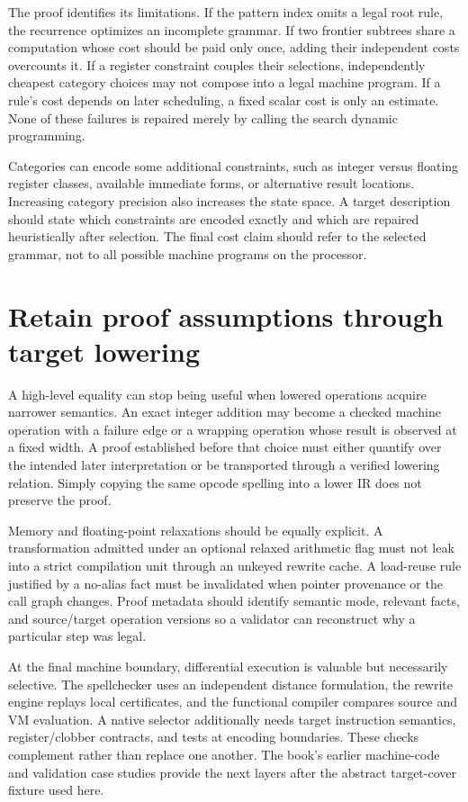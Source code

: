 The proof identifies its limitations.
If the pattern index omits a legal root rule, the recurrence optimizes an incomplete grammar.
If two frontier subtrees share a computation whose cost should be paid only once, adding their independent costs overcounts it.
If a register constraint couples their selections, independently cheapest category choices may not compose into a legal machine program.
If a rule's cost depends on later scheduling, a fixed scalar cost is only an estimate.
None of these failures is repaired merely by calling the search dynamic programming.

Categories can encode some additional constraints, such as integer versus floating register classes, available immediate forms, or alternative result locations.
Increasing category precision also increases the state space.
A target description should state which constraints are encoded exactly and which are repaired heuristically after selection.
The final cost claim should refer to the selected grammar, not to all possible machine programs on the processor.

\section{Retain proof assumptions through target lowering}
\label{sec:ch88-assumptions}
A high-level equality can stop being useful when lowered operations acquire narrower semantics.
An exact integer addition may become a checked machine operation with a failure edge or a wrapping operation whose result is observed at a fixed width.
A proof established before that choice must either quantify over the intended later interpretation or be transported through a verified lowering relation.
Simply copying the same opcode spelling into a lower IR does not preserve the proof.

Memory and floating-point relaxations should be equally explicit.
A transformation admitted under an optional relaxed arithmetic flag must not leak into a strict compilation unit through an unkeyed rewrite cache.
A load-reuse rule justified by a no-alias fact must be invalidated when pointer provenance or the call graph changes.
Proof metadata should identify semantic mode, relevant facts, and source/target operation versions so a validator can reconstruct why a particular step was legal.

At the final machine boundary, differential execution is valuable but necessarily selective.
The spellchecker uses an independent distance formulation, the rewrite engine replays local certificates, and the functional compiler compares source and VM evaluation.
A native selector additionally needs target instruction semantics, register/clobber contracts, and tests at encoding boundaries.
These checks complement rather than replace one another.
The book's earlier machine-code and validation case studies provide the next layers after the abstract target-cover fixture used here.

